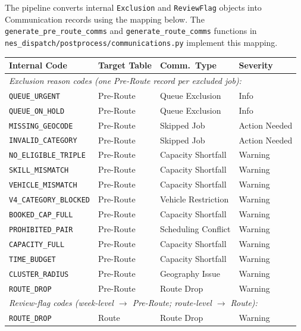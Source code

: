 \documentclass[12pt]{article}
\begin{document}
The pipeline converts internal \texttt{Exclusion} and \texttt{ReviewFlag} objects into Communication records using the mapping below.
The \texttt{generate\_pre\_route\_comms} and \texttt{generate\_route\_comms} functions in \texttt{nes\_dispatch/postprocess/communications.py} implement this mapping.

\medskip
{\small
\begin{longtable}{lllp{4.5cm}}
\toprule
\textbf{Internal Code} & \textbf{Target Table} & \textbf{Comm.\ Type} & \textbf{Severity} \\
\midrule
\multicolumn{4}{l}{\emph{Exclusion reason codes (one Pre-Route record per excluded job):}} \\
\texttt{QUEUE\_URGENT}       & Pre-Route & Queue Exclusion      & Info \\
\texttt{QUEUE\_ON\_HOLD}     & Pre-Route & Queue Exclusion      & Info \\
\texttt{MISSING\_GEOCODE}    & Pre-Route & Skipped Job          & Action Needed \\
\texttt{INVALID\_CATEGORY}   & Pre-Route & Skipped Job          & Action Needed \\
\texttt{NO\_ELIGIBLE\_TRIPLE}& Pre-Route & Capacity Shortfall   & Warning \\
\texttt{SKILL\_MISMATCH}     & Pre-Route & Capacity Shortfall   & Warning \\
\texttt{VEHICLE\_MISMATCH}   & Pre-Route & Capacity Shortfall   & Warning \\
\texttt{V4\_CATEGORY\_BLOCKED}& Pre-Route & Vehicle Restriction & Warning \\
\texttt{BOOKED\_CAP\_FULL}   & Pre-Route & Capacity Shortfall   & Warning \\
\texttt{PROHIBITED\_PAIR}    & Pre-Route & Scheduling Conflict  & Warning \\
\texttt{CAPACITY\_FULL}      & Pre-Route & Capacity Shortfall   & Warning \\
\texttt{TIME\_BUDGET}        & Pre-Route & Capacity Shortfall   & Warning \\
\texttt{CLUSTER\_RADIUS}     & Pre-Route & Geography Issue      & Warning \\
\texttt{ROUTE\_DROP}         & Pre-Route & Route Drop           & Warning \\
\midrule
\multicolumn{4}{l}{\emph{Review-flag codes (week-level $\to$ Pre-Route; route-level $\to$ Route):}} \\
\texttt{ROUTE\_DROP}         & Route     & Route Drop           & Warning \\

\end{longtable}}
\end{document}

